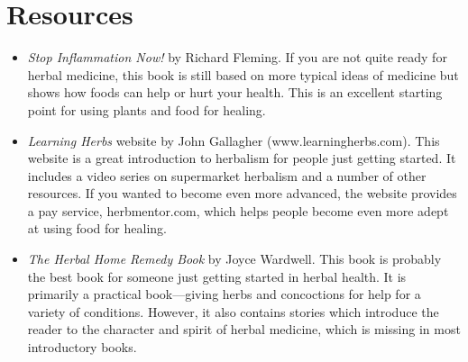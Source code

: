 \section{Resources}

\begin{itemize}
\item 
\textit{Stop Inflammation Now!} by Richard Fleming. If you are not quite
ready for herbal medicine, this book is still based on more typical
ideas of medicine but shows how foods can help or hurt your health.
This is an excellent starting point for using plants and food for
healing.
\item 
\textit{Learning Herbs} website by John Gallagher
(www.learningherbs.com). This website is a great introduction to
herbalism for people just getting started. It includes a video series
on supermarket herbalism and a number of other resources. If you wanted
to become even more advanced, the website provides a pay service,
herbmentor.com, which helps people become even more adept at using food
for healing.
\item 
\textit{The Herbal Home Remedy Book} by Joyce Wardwell. This book is
probably the best book for someone just getting started in herbal
health. It is primarily a practical book—giving herbs and concoctions
for help for a variety of conditions. However, it also contains stories
which introduce the reader to the character and spirit of herbal
medicine, which is missing in most introductory books.
\end{itemize}

